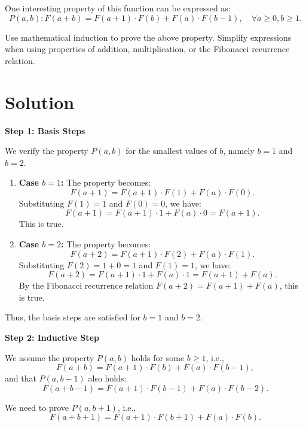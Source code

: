 \documentclass{article}
\begin{document}
One interesting property of this function can be expressed as:
\[
P(a, b): F(a+b) = F(a+1) \cdot F(b) + F(a) \cdot F(b-1), \quad \forall a \geq 0, b \geq 1.
\]

Use mathematical induction to prove the above property. Simplify expressions when using properties of addition, multiplication, or the Fibonacci recurrence relation.

\section*{Solution}

\textbf{Step 1: Basis Steps}

We verify the property \( P(a, b) \) for the smallest values of \( b \), namely \( b = 1 \) and \( b = 2 \).

\begin{enumerate}
    \item \textbf{Case \( b = 1 \):}
    The property becomes:
    \[
    F(a+1) = F(a+1) \cdot F(1) + F(a) \cdot F(0).
    \]
    Substituting \( F(1) = 1 \) and \( F(0) = 0 \), we have:
    \[
    F(a+1) = F(a+1) \cdot 1 + F(a) \cdot 0 = F(a+1).
    \]
    This is true.

    \item \textbf{Case \( b = 2 \):}
    The property becomes:
    \[
    F(a+2) = F(a+1) \cdot F(2) + F(a) \cdot F(1).
    \]
    Substituting \( F(2) = 1 + 0 = 1 \) and \( F(1) = 1 \), we have:
    \[
    F(a+2) = F(a+1) \cdot 1 + F(a) \cdot 1 = F(a+1) + F(a).
    \]
    By the Fibonacci recurrence relation \( F(a+2) = F(a+1) + F(a) \), this is true.
\end{enumerate}

Thus, the basis steps are satisfied for \( b = 1 \) and \( b = 2 \).

\textbf{Step 2: Inductive Step}

We assume the property \( P(a, b) \) holds for some \( b \geq 1 \), i.e.,
\[
F(a+b) = F(a+1) \cdot F(b) + F(a) \cdot F(b-1),
\]
and that \( P(a, b-1) \) also holds:
\[
F(a+b-1) = F(a+1) \cdot F(b-1) + F(a) \cdot F(b-2).
\]

We need to prove \( P(a, b+1) \), i.e.,
\[
F(a+b+1) = F(a+1) \cdot F(b+1) + F(a) \cdot F(b).
\]
\end{document}
